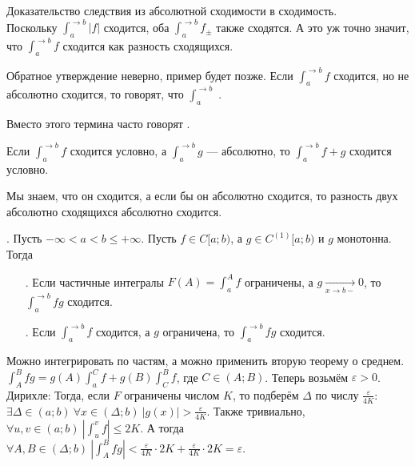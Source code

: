 \documentclass{article}
\begin{document}
\begin{itemize}
\begin{Proof}
            Доказательство следствия из абсолютной сходимости в сходимость.\\
            Поскольку $\int_a^{\to b}|f|$ сходится, оба $\int_a^{\to b}f_\pm$ также сходятся. А это уж точно значит, что $\int_a^{\to b}f$ сходится как разность сходящихся.
        \end{Proof}
        \thm Обратное утверждение неверно, пример будет позже.
        \dfn Если $\int_a^{\to b}f$ сходится, но не абсолютно сходится, то говорят, что $\int_a^{\to b}$ .
        \begin{Comment}
            Вместо этого термина часто говорят .
        \end{Comment}
        \thm Если $\int_a^{\to b}f$ сходится условно, а $\int_a^{\to b}g$ --- абсолютно, то $\int_a^{\to b}f+g$ сходится условно.
        \begin{Proof}
            Мы знаем, что он сходится, а если бы он абсолютно сходится, то разность двух абсолютно сходящихся абсолютно сходится.
        \end{Proof}
        \thm {}. Пусть $-\infty<a<b\leqslant+\infty$. Пусть $f\in C[a;b)$, а $g\in C^{(1)}[a;b)$ и $g$ монотонна. Тогда
        \begin{itemize}
            \item[\undercolor{darkgreen}{Признак Дирихле}.] Если частичные интегралы $F(A)=\int_a^Af$ ограничены, а $g\underset{x\to b-}\longrightarrow0$, то $\int_a^{\to b}fg$ сходится.
            \item[\undercolor{darkgreen}{Признак Абеля}.] Если $\int_a^{\to b}f$ сходится, а $g$ ограничена, то $\int_a^{\to b}fg$ сходится.
        \end{itemize}
        \begin{Proof}
            Можно интегрировать по частям, а можно применить вторую теорему о среднем.\\
            $\int_A^Bfg=g(A)\int_a^Cf+g(B)\int_C^Bf$, где $C\in(A;B)$. Теперь возьмём $\varepsilon>0$.\\
            Дирихле: Тогда, если $F$ ограничены числом $K$, то подберём $\Delta$ по числу $\frac\varepsilon{4K}$: $\exists\Delta\in(a;b)~\forall x\in(\Delta;b)~|g(x)|>\frac\varepsilon{4K}$. Также тривиально, $\forall u,v\in(a;b)~\left|\int_u^vf\right|\leqslant 2K$. А тогда $\forall A,B\in(\Delta;b)~\left|\int_A^Bfg\right|<\frac\varepsilon{4K}\cdot2K+\frac\varepsilon{4K}\cdot 2K=\varepsilon$.\\

\end{Proof}
\end{itemize}
\end{document}
